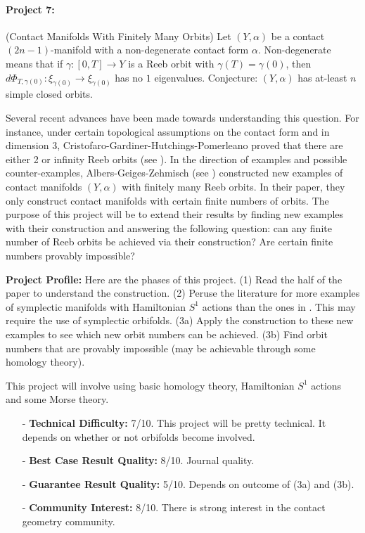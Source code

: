 \documentclass[12pt]{article}
\numberwithin{equation}{section}
\theoremstyle{definition}
\begin{document}
\paragraph{Project 7:} (Contact Manifolds With Finitely Many Orbits) Let $(Y,\alpha)$ be a contact $(2n-1)$-manifold with a non-degenerate contact form $\alpha$. Non-degenerate means that if $\gamma:[0,T] \to Y$ is a Reeb orbit with $\gamma(T) = \gamma(0)$, then $d\Phi_{T,\gamma(0)}:\xi_{\gamma(0)} \to \xi_{\gamma(0)}$ has no $1$ eigenvalues. Conjecture: $(Y,\alpha)$ has at-least $n$ simple closed orbits.

Several recent advances have been made towards understanding this question. For instance, under certain topological assumptions on the contact form and in dimension 3, Cristofaro-Gardiner-Hutchings-Pomerleano proved that there are either 2 or infinity Reeb orbits (see \cite{cghp2018}). In the direction of examples and possible counter-examples, Albers-Geiges-Zehmisch (see \cite{agz2017}) constructed new examples of contact manifolds $(Y,\alpha)$ with finitely many Reeb orbits. In their paper, they only construct contact manifolds with certain finite numbers of orbits. The purpose of this project will be to extend their results by finding new examples with their construction and answering the following question: can any finite number of Reeb orbits be achieved via their construction? Are certain finite numbers provably impossible?

{\bf Project Profile:} Here are the phases of this project. (1) Read the half of the paper \cite{agz2017} to understand the construction. (2) Peruse the literature for more examples of symplectic manifolds with Hamiltonian $S^1$ actions than the ones in \cite{agz2017}. This may require the use of symplectic orbifolds. (3a) Apply the construction to these new examples to see which new orbit numbers can be achieved. (3b) Find orbit numbers that are provably impossible (may be achievable through some homology theory). 

This project will involve using basic homology theory, Hamiltonian $S^1$ actions and some Morse theory.

\begin{itemize}
	\item[-] {\bf Technical Difficulty:} 7/10. This project will be pretty technical. It depends on whether or not orbifolds become involved.
	\item[-] {\bf Best Case Result Quality:} 8/10. Journal quality.
	\item[-] {\bf Guarantee Result Quality:} 5/10. Depends on outcome of (3a) and (3b).
	\item[-] {\bf Community Interest:} 8/10. There is strong interest in the contact geometry community.
\end{itemize}
\end{document}
